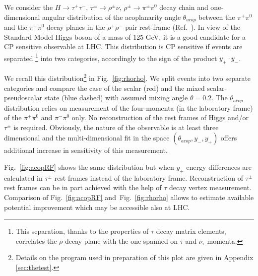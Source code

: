 \documentclass[12pt]{article}
\begin{document}
We consider the $H \to \tau^+ \tau^-$, $\tau^\pm \to \rho^\pm \nu$,
$\rho^\pm \to \pi^\pm \pi^0$ decay chain and one-dimensional angular distribution of the acoplanarity 
angle $\theta_{acop}$ between the $\pi^+ \pi^0$  and the $\pi^- \pi^0$ decay planes in the $\rho^+ \rho^-$ pair 
rest-frame (Ref.~\cite{Bower:2002zx}).
 In view of the Standard Model Higgs boson of a mass of 125 GeV,
it is a  good candidate for a CP sensitive observable at LHC. 
This distribution is CP sensitive if events are separated%
\footnote{This separation, thanks to the properties of $\tau$ decay matrix elements, correlates the $\rho$ decay plane
with the one spanned on $\tau$ and $\nu_\tau$ momenta.} 
into two categories, accordingly to the sign of the product $y_+ \cdot y_- $. 

We recall this distribution\footnote{Details on the program used in preparation of this plot are given in Appendix 
\ref{sec:thetest}.} in Fig.~\ref{fig:rhorho}.  We split events into two separate categories and compare the 
case of the scalar (red) and the mixed scalar-pseudoscalar state (blue dashed) with assumed mixing angle 
$\theta=0.2$. The  $\theta_{acop}$ distribution relies on measurement of the four-momenta (in the laboratory frame)   of the 
$\pi^+ \pi^0$ and $\pi^- \pi^0$ only. No reconstruction of the rest frames of Higgs and/or $\tau^\pm $ is required.
Obviously, the nature of the observable is at least three  dimensional
and the multi-dimensional fit in the space $(\theta_{acop},  y_-, y_+ )$  offers 
additional increase in sensitivity of this measurement.

Fig.~\ref{fig:acopRF} shows the same distribution but when  $y_\pm$ energy differences 
are calculated in  $\tau^\pm$ rest frames instead of the laboratory frame. 
Reconstruction of $\tau^\pm$ rest frames can be in part achieved with 
the help of $\tau$ decay vertex measurement. 
Comparison of Fig.~\ref{fig:acopRF} and~Fig.~\ref{fig:rhorho} allows to estimate available potential improvement
which may be accessible also at LHC. %
\end{document}
